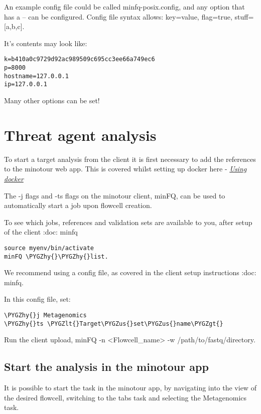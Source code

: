 \documentclass[letterpaper,10pt,english]{sphinxmanual}
\def\PYGZus{\char`\_}
\def\PYGZlt{\char`\<}
\def\PYGZgt{\char`\>}
\def\PYGZhy{\char`\-}
\begin{document}
An example config file could be called minfq-posix.config, and any option that has a -- can be configured. Config file syntax allows: key=value, flag=true, stuff={[}a,b,c{]}.

It's contents may look like:

\begin{Verbatim}[commandchars=\\\{\}]
k=b410a0c9729d92ac989509c695cc3ee66a749ec6
p=8000
hostname=127.0.0.1
ip=127.0.0.1
\end{Verbatim}

Many other options can be set!


\chapter{Threat agent analysis}
\label{dstl::doc}\label{dstl:threat-agent-analysis}
To start a target analysis from the client it is first necessary to add the references to the minotour web app. This is covered whilst setting up docker here - {\hyperref[docker::doc]{\emph{\emph{Using docker}}}}

The -j flags and -ts flags on the minotour client, minFQ, can be used to automatically start a job upon flowcell creation.

To see which jobs, references and validation sets are available to you, after setup of the client :doc: minfq

\begin{Verbatim}[commandchars=\\\{\}]
source myenv/bin/activate
minFQ \PYGZhy{}\PYGZhy{}list.
\end{Verbatim}

We recommend using a config file, as covered in the client setup instructions :doc: minfq.

In this config file, set:

\begin{Verbatim}[commandchars=\\\{\}]
\PYGZhy{}j Metagenomics
\PYGZhy{}ts \PYGZlt{}Target\PYGZus{}set\PYGZus{}name\PYGZgt{}
\end{Verbatim}

Run the client upload, minFQ -n \textless{}Flowcell\_name\textgreater{} -w /path/to/fastq/directory.


\section{Start the analysis in the minotour app}
\label{dstl:start-the-analysis-in-the-minotour-app}
It is possible to start the task in the minotour app, by navigating into the view of the desired flowcell, switching to the tabs task and selecting the Metagenomics task.
\end{document}
